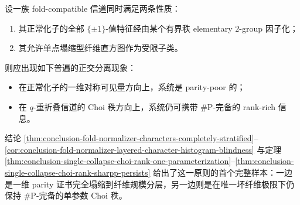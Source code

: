 \begin{conjecture}\label{conj:conclusion-parity-poor-choi-rank-rich-orthogonality}
设一族 fold-compatible 信道同时满足两条性质：
\begin{enumerate}
  \item 其正常化子的全部 \(\{\pm1\}\)-值特征经由某个有界秩 elementary \(2\)-group 因子化；
  \item 其允许单点塌缩型纤维直方图作为受限子类。
\end{enumerate}
则应出现如下普遍的正交分离现象：
\begin{itemize}
  \item 在正常化子的一维对称可见量方向上，系统是 parity-poor 的；
  \item 在 \(q\)-重折叠信道的 Choi 秩方向上，系统仍可携带 \(\#\mathrm P\)-完备的 rank-rich 信息。
\end{itemize}
结论 \ref{thm:conclusion-fold-normalizer-characters-completely-stratified}--\ref{cor:conclusion-fold-normalizer-layered-character-histogram-blindness} 与定理 \ref{thm:conclusion-single-collapse-choi-rank-one-parameterization}--\ref{thm:conclusion-single-collapse-choi-rank-sharpp-persists} 给出了这一原则的首个完整样本：一边是一维 parity 证书完全塌缩到纤维规模分层，另一边则是在唯一坏纤维极限下仍保持 \(\#\mathrm P\)-完备的单参数 Choi 秩。
\end{conjecture}

